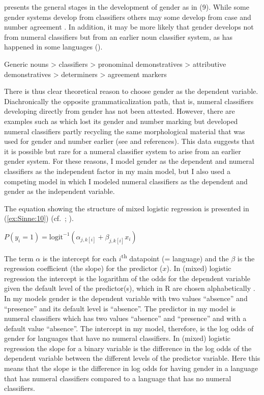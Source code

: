 \documentclass[output=collectionpaper]{langsci/langscibook}
\begin{document}
\citet[451]{Luraghi2011} presents the general stages in the development of gender as in (9). While some gender systems develop from classifiers others may some develop from case and number agreement \citep[452]{Luraghi2011}. In addition, it may be more likely that gender develops not from numeral classifiers but from an earlier noun classifier system, as has happened in some  languages (\citealt{Plaster2007}).

\ea
\label{ex:Sinne:9}
Generic nouns > classifiers > pronominal demonstratives > attributive demonstratives > determiners > agreement markers
\z

There is thus clear theoretical reason to choose gender as the dependent variable. Diachronically the opposite grammaticalization path, that is, numeral classifiers developing directly from gender has not been attested. However, there are examples such as  which lost its gender and number marking but developed numeral classifiers partly recycling the same morphological material that was used for gender and number earlier (see \citealt[379]{Aikhenvald2000} and references). This data suggests that it is possible but rare for a numeral classifier system to arise from an earlier gender system. For these reasons, I model gender as the dependent and numeral classifiers as the independent factor in my main model, but I also used a competing model in which I modeled numeral classifiers as the dependent and gender as the independent variable.

The equation showing the structure of mixed logistic regression is presented in (\ref{ex:Sinne:10}) (cf.\ \citealt[279]{Gelman2007}; \citealt[8]{Bentz2013}).

\ea
\label{ex:Sinne:10}
$P(y_{i}=1)={\text{logit}}^{-1}({\alpha} _{j,k[i]}+{\beta} _{j,k[i]}{x}_{i})$
\z

The term $\alpha$ is the intercept for each $i$\textsuperscript{th} datapoint (= language) and the $\beta$ is the regression coefficient (the slope) for the predictor ($x$). In (mixed) logistic regression the intercept is the logarithm of the odds for the dependent variable given the default level of the predictor(s), which in R are chosen alphabetically \citep[128]{Arppe2008}. In my models gender is the dependent variable with two values ``absence'' and ``presence'' and its default level is ``absence''. The predictor in my model is numeral classifiers which has two values ``absence'' and ``presence'' and with a default value ``absence''. The intercept in my model, therefore, is the log odds of gender for languages that have no numeral classifiers. In (mixed) logistic regression the slope for a binary variable is the difference in the log odds of the dependent variable between the different levels of the predictor variable. Here this means that the slope is the difference in log odds for having gender in a language that has numeral classifiers compared to a language that has no numeral classifiers.
\end{document}
